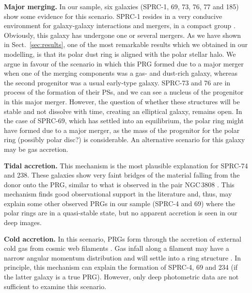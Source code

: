 \documentclass{raa}
\begin{document}

{\bf Major merging.} 
In our sample, six galaxies (SPRC-1, 69, 73, 76, 77 and 185) show some evidence for this scenario. SPRC-1 resides in a very conducive environment for galaxy-galaxy interactions and mergers, in a compact group \citep{1997ARA&A..35..357H}. Obviously, this galaxy has undergone one or several mergers. As we have shown in Sect.~\ref{sec:results}, one of the most remarkable results which we obtained in our modelling, is that its polar dust ring is aligned with the polar stellar halo. We argue in favour of the scenario in which this PRG formed due to a major merger when one of the merging components was a gas- and dust-rich galaxy, whereas the second progenitor was a usual early-type galaxy. SPRC-73 and 76 are in process of the formation of their PSs, and we can see a nucleus of the progenitor in this major merger. However, the question of whether these structures will be stable and not dissolve with time, creating an elliptical galaxy, remains open. In the case of SPRC-69, which has settled into an equilibrium, the polar ring might have formed due to a major merger, as the mass of the progenitor for the polar ring (possibly polar disc?) is considerable. An alternative scenario for this galaxy may be gas accretion.




{\bf Tidal accretion.}
This mechanism is the most plausible explanation for SPRC-74 and 238. These galaxies show very faint bridges of the material falling from the donor onto the PRG, similar to what is observed in the pair NGC\,3808 \citep{ord2016}. This mechanism finds good observational support in the literature \citep[see e.g.][]{rbc2006,2008AstBu..63..201M,2012MNRAS.427.2772F} and, thus, may explain some other observed PRGs in our sample (SPRC-4 and 69) where the polar rings are in a quasi-stable state, but no apparent accretion is seen in our deep images. 

{\bf Cold accretion.} 
In this scenario, PRGs form through the accretion of external cold gas from cosmic web filaments \citep[see e.g.][]{2007MNRAS.382.1809B,stan2009,2010ApJ...714.1081S}. Gas infall along a filament may have a narrow angular momentum distribution and will settle into a ring structure \citep{brook2008}. In principle, this mechanism can explain the formation of SPRC-4, 69 and 234 (if the latter galaxy is a true PRG). However, only deep photometric data are not sufficient to examine this scenario.
\end{document}
